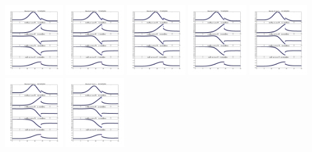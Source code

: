 \documentclass[11pt]{article}
\begin{document}
\vskip 10pt 
\includegraphics[width=0.19\textwidth]{frame0076fig1.png}
\vskip 10pt 
\includegraphics[width=0.19\textwidth]{frame0077fig1.png}
\vskip 10pt 
\includegraphics[width=0.19\textwidth]{frame0078fig1.png}
\vskip 10pt 
\includegraphics[width=0.19\textwidth]{frame0079fig1.png}
\vskip 10pt 
\includegraphics[width=0.19\textwidth]{frame0080fig1.png}
\vskip 10pt 
\includegraphics[width=0.19\textwidth]{frame0081fig1.png}
\vskip 10pt 
\includegraphics[width=0.19\textwidth]{frame0082fig1.png}
\end{document}
